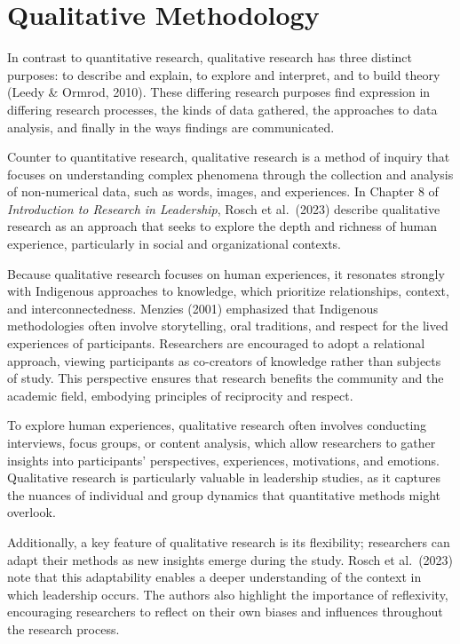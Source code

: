 \documentclass[
  letterpaper,
  DIV=11,
  numbers=noendperiod]{scrreprt}
\begin{document}

\section*{Qualitative Methodology}\label{qualitative-methodology}


In contrast to quantitative research, qualitative research has three
distinct purposes: to describe and explain, to explore and interpret,
and to build theory (Leedy \& Ormrod, 2010). These differing research
purposes find expression in differing research processes, the kinds of
data gathered, the approaches to data analysis, and finally in the ways
findings are communicated.

Counter to quantitative research, qualitative research is a method of
inquiry that focuses on understanding complex phenomena through the
collection and analysis of non-numerical data, such as words, images,
and experiences. In Chapter 8 of \emph{Introduction to Research in
Leadership}, Rosch et al.~(2023) describe qualitative research as an
approach that seeks to explore the depth and richness of human
experience, particularly in social and organizational contexts.

Because qualitative research focuses on human experiences, it resonates
strongly with Indigenous approaches to knowledge, which prioritize
relationships, context, and interconnectedness. Menzies (2001)
emphasized that Indigenous methodologies often involve storytelling,
oral traditions, and respect for the lived experiences of participants.
Researchers are encouraged to adopt a relational approach, viewing
participants as co-creators of knowledge rather than subjects of study.
This perspective ensures that research benefits the community and the
academic field, embodying principles of reciprocity and respect.

To explore human experiences, qualitative research often involves
conducting interviews, focus groups, or content analysis, which allow
researchers to gather insights into participants' perspectives,
experiences, motivations, and emotions. Qualitative research is
particularly valuable in leadership studies, as it captures the nuances
of individual and group dynamics that quantitative methods might
overlook.

Additionally, a key feature of qualitative research is its flexibility;
researchers can adapt their methods as new insights emerge during the
study. Rosch et al.~(2023) note that this adaptability enables a deeper
understanding of the context in which leadership occurs. The authors
also highlight the importance of reflexivity, encouraging researchers to
reflect on their own biases and influences throughout the research
process.
\end{document}
